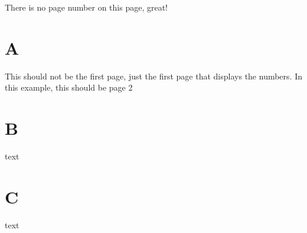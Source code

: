\documentclass[a4paper, 12pt, titlepage]{article}
\begin{document}
\pagestyle{empty}  %
\tableofcontents
There is no page number on this page, great!
\clearpage
\pagestyle{plain} %

\section{A}
This should not be the first page, 
just the first page that displays the numbers.
In this example, this should be page 2
\clearpage
\section{B}
text
\clearpage
\section{C}
text
\end{document}
